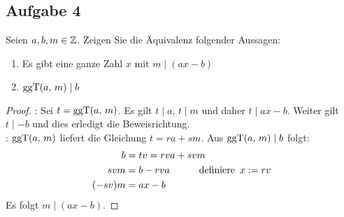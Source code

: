 \subsection{Aufgabe 4}
\label{70:4}
Seien $a,b,m \in \mathbb{Z}{}$. Zeigen Sie die Äquivalenz folgender Aussagen:
\begin{enumerate}[label=\roman*)]
  \item Es gibt eine ganze Zahl $x$ mit $m \mid (ax - b)$
  \item $\text{ggT}(a,\,m) \mid b$
\end{enumerate}
\begin{proof}
  : Sei $t = \text{ggT}(a,\,m)$. Es gilt $t \mid a$, $t \mid m$ und
  daher $t \mid ax - b$. Weiter gilt $t \mid -b$ und dies erledigt die Beweisrichtung.\\
  : $\text{ggT}(a,\,m)$ liefert die Gleichung $t = ra + sm$.
  Aus $\text{ggT}(a,\,m) \mid b$ folgt:
  \begin{equation*}
    \begin{aligned}
      b      & = tv = rva + svm                                              \\
      svm    & = b - rva \qquad\quad \text{definiere} \enspace x := rv \\
      (-sv)m & = ax - b
    \end{aligned}
  \end{equation*}
  Es folgt $m \mid (ax - b)$.
\end{proof}

